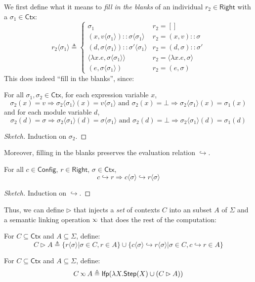 \documentclass[acmsmall,screen,review]{acmart}\settopmatter{printfolios=true,printccs=false,printacmref=false}
\newcommand*{\cons}{::}
\newcommand*{\modid}{d}
\newcommand*{\ctx}{\sigma}
\newcommand*{\Ctx}{\mathsf{Ctx}}
\newcommand*{\Config}{\mathsf{Config}}
\newcommand*{\config}{c}
\newcommand*{\Right}{\mathsf{Right}}
\newcommand*{\rightst}{r}
\newcommand*{\lfp}{\mathsf{lfp}}
\newcommand*{\Step}{\mathsf{Step}}
\newcommand*{\semarrow}{\hookrightarrow}
\newcommand*{\semlink}{\mathbin{\rotatebox[origin=c]{180}{$\propto$}}}
\newcommand*{\inject}[2]{{#2}\langle{#1}\rangle}
\begin{document}
We first define what it means to \emph{fill in the blanks} of an individual $r_2\in\Right$ with a $\ctx_1\in\Ctx$:
\[
  \inject{\ctx_{1}}{r_{2}}\triangleq
  \begin{cases}
    \ctx_1                                                         & r_{2}=[]                           \\
    (x, \inject{\ctx_1}{v})\cons\inject{\ctx_{1}}{\ctx}            & r_{2}=(x,v)\cons \ctx              \\
    (\modid, \inject{\ctx_{1}}{\ctx})\cons\inject{\ctx_{1}}{\ctx'} & r_{2}=(\modid,\ctx)\cons \ctx'     \\
    \langle\lambda x.e,\inject{\ctx_1}{\ctx}\rangle                & r_2=\langle\lambda x.e,\ctx\rangle \\
    (e,\inject{\ctx_1}{\ctx})                                      & r_2 = (e, \ctx)
  \end{cases}
\]
This does indeed ``fill in the blanks'', since:
\begin{lemma}
  For all $\ctx_1,\ctx_2\in\Ctx$, for each expression variable $x$,
  \[
    \ctx_2(x)=v\Rightarrow\inject{\ctx_1}{\ctx_2}(x)=\inject{\ctx_1}{v}\text{ and }\ctx_2(x)=\bot\Rightarrow\inject{\ctx_1}{\ctx_2}(x)=\ctx_1(x)
  \]
  and for each module variable $\modid$,
  \[
    \ctx_2(\modid)=\ctx\Rightarrow\inject{\ctx_1}{\ctx_2}(d)=\inject{\ctx_1}{\ctx}\text{ and }\ctx_2(\modid)=\bot\Rightarrow\inject{\ctx_1}{\ctx_2}(\modid)=\ctx_1(\modid)
  \]
\end{lemma}
\begin{proof}[Sketch]
  Induction on $\ctx_2$.
\end{proof}

Moreover, filling in the blanks preserves the evaluation relation $\semarrow$.
\begin{lemma}[Injection Preserves $\semarrow$]\label{lem:injpreseval}
  For all $\config\in\Config$, $\rightst\in\Right$, $\ctx\in\Ctx$,
  \[\config\semarrow\rightst\Rightarrow\inject{\ctx}{\config}\semarrow\inject{\ctx}{\rightst}\]
\end{lemma}
\begin{proof}[Sketch]
  Induction on $\semarrow$.
\end{proof}

Thus, we can define $\rhd$ that injects a \emph{set} of contexts $C$ into an subset $A$ of $\Sigma$ and a semantic linking operation $\semlink$ that does the rest of the computation:
\begin{definition}[Injection]
  For $C\subseteq\Ctx$ and $A\subseteq\Sigma$, define:
  \[C\rhd A\triangleq\{\inject{\ctx}{\rightst}|\ctx\in C,\rightst\in A\}\cup\{\inject{\ctx}{\config}\semarrow\inject{\ctx}{\rightst}|\ctx\in C,\config\semarrow\rightst\in A\}\]
\end{definition}
\begin{definition}
  For $C\subseteq\Ctx$ and $A\subseteq \Sigma$, define:
  \[C\semlink A\triangleq\lfp(\lambda X.\Step(X)\cup(C\rhd A))\]
\end{definition}
\end{document}
